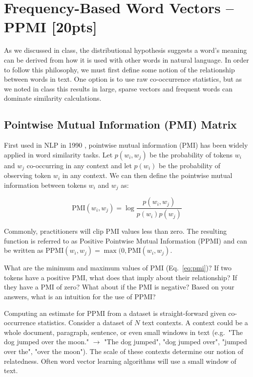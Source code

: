 \documentclass[a4paper,10pt]{article}
\begin{document}
\section{Frequency-Based Word Vectors -- PPMI [20pts]}

As we discussed in class, the distributional hypothesis suggests a word's meaning can be derived from how it is used with other words in natural language. In order to follow this philosophy, we must first define some notion of the relationship between words in text. One option is to use raw co-occurrence statistics, but as we noted in class this results in large, sparse vectors and frequent words can dominate similarity calculations. 

\subsection{Pointwise Mutual Information (PMI) Matrix}
First used in NLP in 1990 \cite{church1990word}, pointwise mutual information (PMI) has been widely applied in word similarity tasks. Let $p(w_i, w_j)$ be the probability of tokens $w_i$ and $w_j$ co-occurring in any context and let $p(w_i)$ be the probability of observing token $w_i$ in any context. We can then define the pointwise mutual information between tokens $w_i$ and $w_j$ as:

\begin{equation}
    \mbox{PMI}(w_i,w_j) = \log \frac{p(w_i, w_j)}{p(w_i)p(w_j)}
    \label{eq:pmi}
\end{equation}

\noindent Commonly, practitioners will clip PMI values less than zero. The resulting function is referred to as Positive Pointwise Mutual Information (PPMI) and can be written as $\mbox{PPMI}(w_i, w_j) = \max(0, \mbox{PMI}(w_i, w_j)$.

\vspace{5pt}
\begin{taskbox}
 What are the minimum and maximum values of PMI (Eq.~\ref{eq:pmi})? If two tokens have a positive PMI, what does that imply about their relationship? If they have a PMI of zero? What about if the PMI is negative? Based on your answers, what is an intuition for the use of PPMI?
\end{taskbox}
\vspace{5pt}


 Computing an estimate for PPMI from a dataset is straight-forward given co-occurrence statistics. Consider a dataset of $N$ text contexts. A context could be a whole document, paragraph, sentence, or even small windows in text (e.g.~"The dog jumped over the moon." $\rightarrow$ "The dog jumped", "dog jumped over", "jumped over the", "over the moon"). The scale of these contexts determine our notion of relatedness. Often word vector learning algorithms will use a small window of text.
\end{document}
